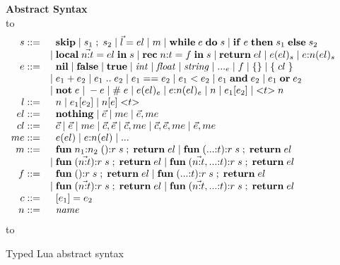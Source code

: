 \documentclass{paper}
\def\dstart{\hbox to \hsize{\vrule depth 4pt\hrulefill\vrule depth 4pt}}
\def\dend{\hbox to \hsize{\vrule height 4pt\hrulefill\vrule height 4pt}}
\begin{document}
\begin{figure}[!ht]
\textbf{Abstract Syntax}\\
\dstart
$$
\begin{array}{rl}
s ::= & \;\; \mathbf{skip} \; | \;
s_{1} \; ; \; s_{2} \; | \;
\vec{l} = el \; | \;
m \; | \;
\mathbf{while} \; e \; \mathbf{do} \; s \; | \;
\mathbf{if} \; e \; \mathbf{then} \; s_{1} \; \mathbf{else} \; s_{2}\\
& | \; \mathbf{local} \; \vec{n{:}t} = el \; \mathbf{in} \; s \; | \;
\mathbf{rec} \; n{:}t = f \; \mathbf{in} \; s \; | \;
\mathbf{return} \; el \; | \;
e(el)_{s} \; | \;
e{:}n(el)_{s}\\
e ::= & \;\; \mathbf{nil} \; | \;
\mathbf{false} \; | \;
\mathbf{true} \; | \;
{\it int} \; | \;
{\it float} \; | \;
{\it string} \; | \;
{...}_{e} \; | \;
f \; | \;
\{ \} \; | \;
\{ \; cl \; \} \\
& | \; e_{1} + e_{2} \; | \;
e_{1} \; {..} \; e_{2} \; | \;
e_{1} == e_{2} \; | \;
e_{1} < e_{2} \; | \;
e_{1} \; \mathbf{and} \; e_{2} \; | \;
e_{1} \; \mathbf{or} \; e_{2} \\
& | \; \mathbf{not} \; e \; | \;
- e \; | \;
\# \; e \; | \;
e(el)_{e} \; | \;
e{:}n(el)_{e} \; | \;
n \; | \;
e_{1}[e_{2}] \; | \;
{<}t{>} \; n\\
l ::= & \;\; n \; | \;
e_{1}[e_{2}] \; | \;
n[e] \; {<}t{>}\\
el ::= & \;\; \mathbf{nothing} \; | \;
\vec{e} \; | \;
me \; | \;
\vec{e}, me\\
cl ::= & \;\; \vec{c} \; | \;
\vec{e} \; | \;
me \; | \;
\vec{c}, \vec{e} \; | \;
\vec{c}, me \; | \;
\vec{c}, \vec{e}, me \; | \;
\vec{e}, me\\
me ::= & \;\; e(el) \; | \;
e{:}n(el) \; | \;
{...}\\
m ::= & \;\; \mathbf{fun} \; n_{1}{:}n_{2} \; (){:}r \; s \; ; \; \mathbf{return} \; el \; | \;
\mathbf{fun} \; ({...}{:}t){:}r \; s \; ; \; \mathbf{return} \; el\\
& | \; \mathbf{fun} \; (\vec{n{:}t}){:}r \; s \; ; \; \mathbf{return} \; el \; | \;
\mathbf{fun} \; (\vec{n{:}t},{...}{:}t){:}r \; s \; ; \; \mathbf{return} \; el\\
f ::= & \;\; \mathbf{fun} \; (){:}r \; s \; ; \; \mathbf{return} \; el \; | \;
\mathbf{fun} \; ({...}{:}t){:}r \; s \; ; \; \mathbf{return} \; el\\
& | \; \mathbf{fun} \; (\vec{n{:}t}){:}r \; s \; ; \; \mathbf{return} \; el \; | \;
\mathbf{fun} \; (\vec{n{:}t},{...}{:}t){:}r \; s \; ; \; \mathbf{return} \; el\\
c ::= & \;\; [e_{1}] = e_{2}\\
n ::= & \;\; {\it name}\\
\end{array}
$$
\dend
\caption{Typed Lua abstract syntax}
\label{fig:syntax}
\end{figure}
\end{document}
